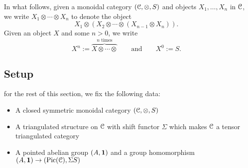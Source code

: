 \documentclass[../main.tex]{subfiles}
\begin{document}
In what follows, given a monoidal category $(\mathcal C,\otimes,S)$ and objects $X_1,\ldots,X_n$ in $\mathcal C$, we write $X_1\otimes\cdots\otimes X_n$ to denote the object
\[X_1\otimes(X_2\otimes\cdots\otimes (X_{n-1}\otimes X_n)).\]
Given an object $X$ and some $n>0$, we write
\[X^n:=\overbrace{X\otimes\cdots\otimes}^\text{$n$ times}\qquad\text{and}\qquad X^0:=S.\]

\subsection{Setup}

for the rest of this section, we fix the following data:\begin{itemize}
    \item A closed symmetric monoidal category $(\mathcal C,\otimes,S)$
    \item A triangulated structure on $\mathcal C$ with shift functor $\Sigma$ which makes $\mathcal C$ a tensor triangulated category
    \item A pointed abelian group $(A,\mathbf{1})$ and a group homomorphism $(A,\mathbf{1})\to(\operatorname{Pic}(\mathcal C),\Sigma S)$
\end{itemize}
\end{document}
